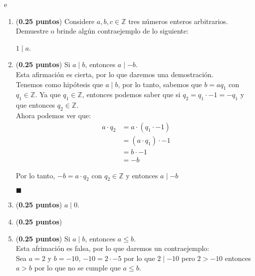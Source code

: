 e\documentclass[fontsize=12pt]{scrartcl}
\begin{document}
	\begin{enumerate}
		\item ({\bf 0.25 puntos}) 		
		Considere $a, b, c \in \mathbb{Z}$ tres n\'umeros enteros arbitrarios.
		Demuestre o brinde alg\'un contraejemplo de lo siguiente:
		
		$1 \mid a$.

		\item ({\bf 0.25 puntos})
		  Si $a \mid b$, entonces $a \mid -b$. \\
                  Esta afirmación es cierta, por lo que daremos una demostración. \\
		Tenemos como hipótesis que $a \mid b$, por lo tanto, sabemos que $b = a q_1$ con $q_1 \in \mathbb{Z} $.
                Ya que $q_1 \in \mathbb{Z}$, entonces podemos saber que si  $q_2 = q_1 \cdot -1 = -q_1 $ y que entonces $q_2\in \mathbb{Z}$.\\
                Ahora podemos ver que: \\
                \begin{equation*}
                  \begin{split}
                    a \cdot q_2 &= a \cdot (q_1 \cdot -1) \\
                    &= (a \cdot q_1) \cdot -1 \\
                    &= b \cdot -1 \\
                    &= -b 
                  \end{split}
                \end{equation*}
                
                Por lo tanto, $-b = a \cdot q_2$ con $q_2 \in \mathbb{Z}$ y entonces $a \mid -b$
                \begin{flushright}
                  $\blacksquare$
                \end{flushright}

		\item ({\bf 0.25 puntos})
		$a \mid 0$.

		\item ({\bf 0.25 puntos})
	
		\item ({\bf 0.25 puntos})
		  Si $a \mid b$, entonces $a \leq b$. \\
                  Esta afrimación es falsa, por lo que daremos un contraejemplo: \\
                  Sea $a = 2$ y $b= -10$, $-10 = 2 \cdot -5$ por lo que
                  $2 \mid -10$ pero $2 > -10$ entonces $a > b$ por lo que no se cumple que  $a \leq b$.
		

\end{enumerate}
\end{document}
